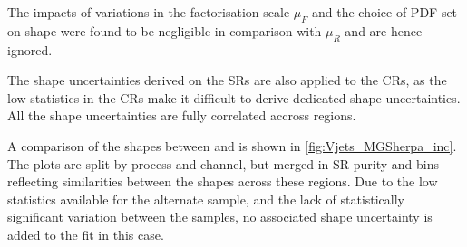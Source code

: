 The impacts of variations in the factorisation scale $\mu_{F}$ and the choice of PDF set on \mJ shape were found to be negligible in comparison with $\mu_{R}$ and are hence ignored.

The shape uncertainties derived on the SRs are also applied to the CRs, as the low statistics in the CRs make it difficult to derive dedicated shape uncertainties.
All the shape uncertainties are fully correlated accross regions.



A comparison of the \mJ shapes between \SHERPA and \MADGRAPH is shown in \cref{fig:Vjets_MGSherpa_inc}.
The plots are split by process and channel, but merged in SR purity and \ptv bins reflecting similarities between the \mJ shapes across these regions.
Due to the low statistics available for the alternate \MADGRAPH sample, and the lack of statistically significant variation between the samples, no associated shape uncertainty is added to the fit in this case. 

